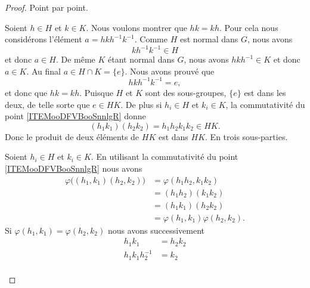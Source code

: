 \begin{proof}
	Point par point.
	\begin{subproof}
		\spitem[\ref{ITEMooDFVBooSnnlgR}]
		Soient \( h\in H\) et \( k\in K\). Nous voulons montrer que \( hk=kh\). Pour cela nous considérons l'élément \( a=hkh^{-1}k^{-1}\). Comme \( H \) est normal dans \( G\), nous avons
		\begin{equation}
			kh^{-1}k^{-1}\in H
		\end{equation}
		et donc \( a\in H\). De même \( K\) étant normal dans \( G\), nous avons \( hkh^{-1}\in K\) et donc \( a\in K\). Au final \( a\in H\cap K=\{ e \}\). Nous avons prouvé que
		\begin{equation}
			hkh^{-1}k^{-1}=e,
		\end{equation}
		et donc que \( hk=kh\).
		\spitem[\ref{ITEMooVVBGooZSJqjp}]
		Puisque \( H\) et \( K\) sont des sous-groupes, \( \{ e \}\) est dans les deux, de telle sorte que \( e\in HK\). De plus si \( h_i\in H\) et \( k_i\in K\), la commutativité du point \ref{ITEMooDFVBooSnnlgR} donne
		\begin{equation}
			(h_1k_1)(h_2k_2)=h_1h_2k_1k_2\in HK.
		\end{equation}
		Donc le produit de deux éléments de \( HK\) est dans \( HK\).
		\spitem[\ref{IMTEooPCBZooQoZFOD}]
		En trois sous-parties.
		\begin{subproof}
			\spitem[Morphisme]
			Soient \( h_i\in H\) et \( k_i\in K\). En utilisant la commutativité du point \ref{ITEMooDFVBooSnnlgR} nous avons
			\begin{subequations}
				\begin{align}
					\varphi\big( (h_1,k_1)(h_2,k_2) \big) & =\varphi(h_1h_2,k_1k_2)            \\
					                                      & =(h_1h_2)(k_1k_2)                  \\
					                                      & =(h_1k_1)(h_2k_2)                  \\
					                                      & =\varphi(h_1,k_1)\varphi(h_2,k_2).
				\end{align}
			\end{subequations}
			\spitem[Injectif]
			Si \( \varphi(h_1,k_1)=\varphi(h_2,k_2)\) nous avons successivement
			\begin{subequations}
				\begin{align}
					h_1k_1                 & =h_2k_2       \\
					h_1 k_1 h_2^{-1}       & =k_2          \\

\end{align}
\end{subequations}
\end{subproof}
\end{subproof}
\end{proof}
